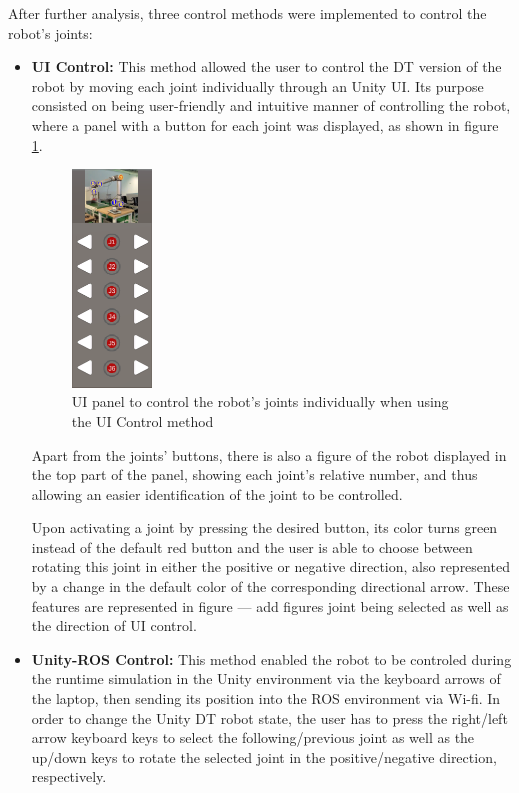 After further analysis, three control methods were implemented to control the robot's joints:
\begin{itemize}
    \item \textbf{UI Control:} This method allowed the user to control the \ac{DT} version of the robot by moving each joint individually through an Unity \ac{UI}. Its purpose consisted on being user-friendly and intuitive manner of controlling the robot, where a panel with a button for each joint was displayed, as shown in figure \ref{f:ui-control}. 
    
    \begin{figure}[h]
        \centering
        \includegraphics[width=0.2\textwidth]{figs/toggle-1.png}
        \caption{\ac{UI} panel to control the robot's joints individually when using the \ac{UI} Control method}
        \label{f:ui-control}
    \end{figure}
    \FloatBarrier

    Apart from the joints' buttons, there is also a figure of the robot displayed in the top part of the panel, showing each joint's relative number, and thus allowing an easier identification of the joint to be controlled.
    
    Upon activating a joint by pressing the desired button, its color turns green instead of the default red button and the user is able to choose between rotating this joint in either the positive or negative direction, also represented by a change in the default color of the corresponding directional arrow. These features are represented in figure --- add figures joint being selected as well as the direction of UI control.
    
   
    \item \textbf{Unity-ROS Control:} This method enabled the robot to be controled during the runtime simulation in the Unity environment via the keyboard arrows of the laptop, then sending its position into the ROS environment via Wi-fi. 
    In order to change the Unity \ac{DT} robot state, the user has to press the right/left arrow keyboard keys to select the following/previous joint as well as the up/down keys to rotate the selected joint in the positive/negative direction, respectively.
    

\end{itemize}
